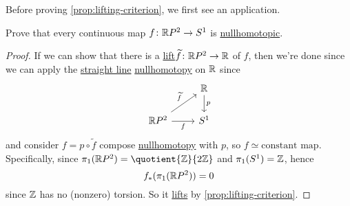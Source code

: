 Before proving \autoref{prop:lifting-criterion}, we first see an application.
\begin{eg}
	Prove that every continuous map \(f\colon \mathbb{\MakeUppercase{r}} P^{2}\to S^1\) is \hyperref[def:nullhomotopic]{nullhomotopic}.
	\begin{proof}
		If we can show that there is a \hyperref[prop:homotopy-lifting-property]{lift}\(\widetilde{f} \colon \mathbb{\MakeUppercase{r}} P^{2}\to \mathbb{\MakeUppercase{r}}\) of \(f\),
		then we're done since we can apply the \hyperref[eg:lec1:straight-line-homotopy]{straight line} \hyperref[def:nullhomotopic]{nullhomotopy}
		on \(\mathbb{\MakeUppercase{r}} \) since
		\[\begin{tikzcd}
				& {\mathbb{R}} \\
				{\mathbb{R}P^2} & {S^1}
				\arrow["f"', from=2-1, to=2-2]
				\arrow["{\widetilde{f}}", from=2-1, to=1-2]
				\arrow["p", from=1-2, to=2-2]
			\end{tikzcd}\]
		and consider \(f = p \circ \widetilde{f} \) compose \hyperref[def:nullhomotopic]{nullhomotopy} with \(p\), so \(f\simeq \text{constant map} \).
		Specifically, since \(\pi _1(\mathbb{\MakeUppercase{r}} P^{2}) = \quotient{\mathbb{\MakeUppercase{z}}}{2 \mathbb{\MakeUppercase{z}}}\) and
		\(\pi _1(S^1) = \mathbb{\MakeUppercase{z}} \), hence
		\[
			f_\ast (\pi _1(\mathbb{\MakeUppercase{r}} P^{2} )) = 0
		\]
		since \(\mathbb{\MakeUppercase{z}} \) has no (nonzero) torsion. So it \hyperref[prop:homotopy-lifting-property]{lifts} by
		\autoref{prop:lifting-criterion}.
	\end{proof}
\end{eg}

